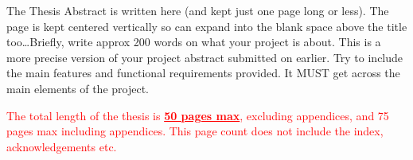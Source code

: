 The Thesis Abstract is written here (and kept just one page long or less). The page is kept centered vertically so can expand into the blank space above the title too\ldots Briefly, write approx 200 words on what your project is about. This is a more precise version of your project abstract submitted on earlier. Try to include the main features and functional requirements provided. It MUST get across the main elements of the project.

\textcolor{red}{The total length of the thesis is \textbf{\underline{50 pages max}}, excluding appendices, and 75 pages max including appendices. This page count does not include the index, acknowledgements etc.}